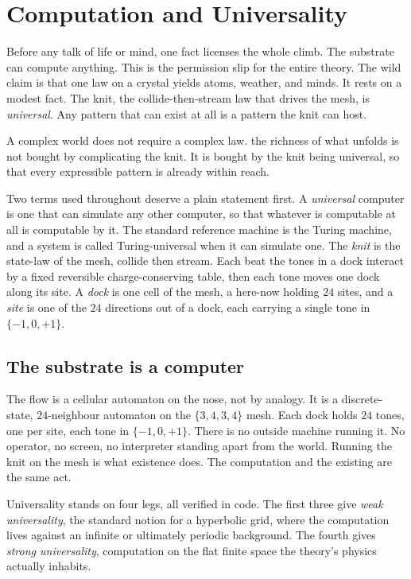 \section{Computation and Universality}

Before any talk of life or mind, one fact licenses the whole climb. The substrate can compute anything. This is the permission slip for the entire theory. The wild claim is that one law on a crystal yields atoms, weather, and minds. It rests on a modest fact. The knit, the collide-then-stream law that drives the mesh, is \emph{universal}. Any pattern that can exist at all is a pattern the knit can host.

\begin{principle}
A complex world does not require a complex law. the richness of what unfolds is not bought by complicating the knit. It is bought by the knit being universal, so that every expressible pattern is already within reach.
\end{principle}

Two terms used throughout deserve a plain statement first. A \emph{universal} computer is one that can simulate any other computer, so that whatever is computable at all is computable by it. The standard reference machine is the Turing machine, and a system is called Turing-universal when it can simulate one. The \emph{knit} is the state-law of the mesh, collide then stream. Each beat the tones in a dock interact by a fixed reversible charge-conserving table, then each tone moves one dock along its site. A \emph{dock} is one cell of the mesh, a here-now holding $24$ sites, and a \emph{site} is one of the $24$ directions out of a dock, each carrying a single tone in $\{-1, 0, +1\}$.

\subsection{The substrate is a computer}

The flow is a cellular automaton on the nose, not by analogy. It is a discrete-state, $24$-neighbour automaton on the $\{3,4,3,4\}$ mesh. Each dock holds $24$ tones, one per site, each tone in $\{-1, 0, +1\}$. There is no outside machine running it. No operator, no screen, no interpreter standing apart from the world. Running the knit on the mesh is what existence does. The computation and the existing are the same act.

Universality stands on four legs, all verified in code. The first three give \emph{weak universality}, the standard notion for a hyperbolic grid, where the computation lives against an infinite or ultimately periodic background. The fourth gives \emph{strong universality}, computation on the flat finite space the theory's physics actually inhabits.

